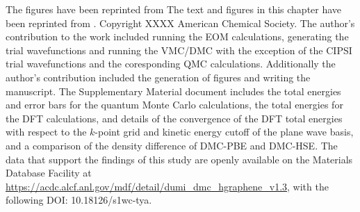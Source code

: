 The figures have been reprinted from \cite{10.1063/5.0085982}
The text and figures in this chapter have been reprinted from \cite{10.1063/5.0085982}.
Copyright XXXX American Chemical Society. %
The author's contribution to the work included running the EOM calculations, generating the trial wavefunctions and running the VMC/DMC with the exception of the CIPSI trial wavefunctions and the coresponding QMC calculations. Additionally the author's contribution included the generation of figures and writing the manuscript.
The Supplementary Material document includes the total energies and error bars for the quantum Monte Carlo calculations, the total energies for the DFT calculations, and details of the convergence of the DFT total energies with respect to the $k$-point grid and kinetic energy cutoff of the plane wave basis, and a comparison of the density difference of DMC-PBE and DMC-HSE.
 The data that support the findings of this study are openly available on the Materials Database Facility at \url{https://acdc.alcf.anl.gov/mdf/detail/dumi_dmc_hgraphene_v1.3}, with the following DOI: 10.18126/s1wc-tya.
